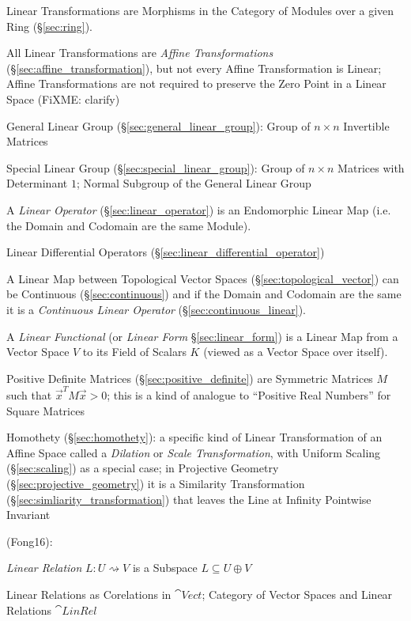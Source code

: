 Linear Transformations are Morphisms in the Category of Modules over a given
Ring (\S\ref{sec:ring}).

All Linear Transformations are \emph{Affine Transformations}
(\S\ref{sec:affine_transformation}), but not every Affine Transformation is
Linear; Affine Transformations are not required to preserve the Zero Point in a
Linear Space (FiXME: clarify)

\fist General Linear Group (\S\ref{sec:general_linear_group}): Group of $n
\times n$ Invertible Matrices

\fist Special Linear Group (\S\ref{sec:special_linear_group}): Group of $n
\times n$ Matrices with Determinant $1$; Normal Subgroup of the General Linear
Group

A \emph{Linear Operator} (\S\ref{sec:linear_operator}) is an Endomorphic Linear
Map (i.e. the Domain and Codomain are the same Module).

\fist Linear Differential Operators (\S\ref{sec:linear_differential_operator})

A Linear Map between Topological Vector Spaces
(\S\ref{sec:topological_vector}) can be Continuous
(\S\ref{sec:continuous}) and if the Domain and Codomain are the same
it is a \emph{Continuous Linear Operator} (\S\ref{sec:continuous_linear}).

A \emph{Linear Functional} (or \emph{Linear Form} \S\ref{sec:linear_form}) is a
Linear Map from a Vector Space $V$ to its Field of Scalars $K$ (viewed as a
Vector Space over itself).

Positive Definite Matrices (\S\ref{sec:positive_definite}) are Symmetric
Matrices $M$ such that $\vec{x}^T M \vec{x} > 0$; this is a kind of analogue to
``Positive Real Numbers'' for Square Matrices

Homothety (\S\ref{sec:homothety}): a specific kind of Linear Transformation of
an Affine Space called a \emph{Dilation} or \emph{Scale Transformation}, with
Uniform Scaling (\S\ref{sec:scaling}) as a special case; in Projective Geometry
(\S\ref{sec:projective_geometry}) it is a Similarity Transformation
(\S\ref{sec:simliarity_transformation}) that leaves the Line at Infinity
Pointwise Invariant

(Fong16):


\emph{Linear Relation} $L : U \rightsquigarrow V$ is a Subspace $L
\subseteq U \oplus V$

Linear Relations as Corelations in $\cat{Vect}$; Category of Vector
Spaces and Linear Relations $\cat{LinRel}$



